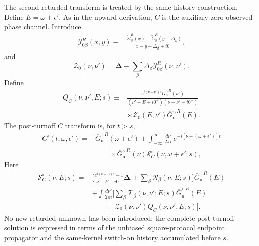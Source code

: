 \documentclass[
 reprint,
 superscriptaddress,
 amsmath,amssymb,
 aps,prb,
 longbibliography,
 floatfix
]{revtex4-2}
\begin{document}
The second retarded transform is treated by the same history construction. Define $E=\omega+\epsilon'$. As in the upward derivation, $C$ is the auxiliary zero-observed-phase channel. Introduce
\begin{equation*}
\begin{aligned}
\mathcal Y_{0\beta}^R(x,y)
\equiv{}&
\frac{
\widetilde\Sigma_\beta^R(x)
-
\widetilde\Sigma_\beta^R(y-\Delta_\beta)
}
{x-y+\Delta_\beta+i0^+},
\end{aligned}
\end{equation*}
and
\begin{equation*}
\mathcal Z_0(\nu,\nu')
=
\bm\Delta
-
\sum_\beta
\Delta_\beta
\mathcal Y_{0\beta}^R(\nu,\nu').
\end{equation*}
Define
\begin{equation*}
\begin{aligned}
Q_C(\nu,\nu',E;s)
\equiv{}&
\frac{
e^{i(\nu-\nu')s}
\overline G_{\mathrm b}^{\square,R}(\nu')
}
{
(\nu'-E+i0^+)
(\nu-\nu'-i0^+)
}
\\
&\times
\mathcal Z_0(E,\nu')
\overline G_{\mathrm u}^{\square,R}(E).
\end{aligned}
\end{equation*}
The post-turnoff $C$ transform is, for $t>s$,
\begin{equation*}
\begin{aligned}
C^\square(t,\omega,\epsilon')
={}&
\overline G_{\mathrm u}^{\square,R}
(\omega+\epsilon')
+
\int_{-\infty}^{\infty}
\frac{d\nu}{2\pi i}\,
e^{-i[\nu-(\omega+\epsilon')]t}
\\
&\qquad\times
\overline G_{\mathrm u}^{\square,R}(\nu)
\mathcal S_C^\square
(\nu,\omega+\epsilon';s),
\end{aligned}
\end{equation*}
Here
\begin{equation*}
\begin{aligned}
\mathcal S_C^\square(\nu,E;s)
={}&
\Bigg[
\frac{
e^{i(\nu-E)s}-1
}
{\nu-E-i0^+}
\bm\Delta
+
\sum_\beta
\mathcal R_\beta(\nu,E;s)
\Bigg]
\overline G_{\mathrm u}^{\square,R}(E)
\\
&+
\int\frac{d\nu'}{2\pi i}
\Bigg[
\sum_\beta
\mathcal T_\beta(\nu,\nu';E;s)
\overline G_{\mathrm u}^{\square,R}(E)
\\
&\qquad-
\mathcal Z_0(\nu,\nu')
Q_C(\nu,\nu',E;s)
\Bigg].
\end{aligned}
\end{equation*}
No new retarded unknown has been introduced: the complete post-turnoff solution is expressed in terms of the unbiased square-protocol endpoint propagator and the same-kernel switch-on history accumulated before $s$.
\end{document}
